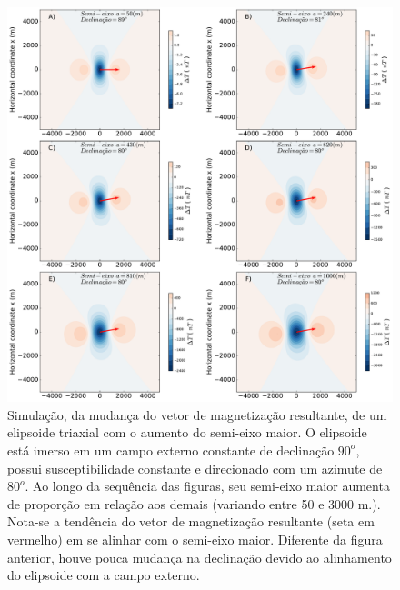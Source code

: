 \begin{figure}[hbt!]
	\centering \includegraphics[width=16 cm,height=16 cm]{figures/ellipsoid_shape_iso2}
	\caption[Simulação, da mudança do vetor de magnetização resultante, de um elipsoide triaxial com o aumento do semi-eixo maior.]{Simulação, da mudança do vetor de magnetização resultante, de um elipsoide triaxial com o aumento do semi-eixo maior. O elipsoide está imerso em um campo externo constante de declinação $90^o$, possui susceptibilidade constante e direcionado com um azimute de $80^o$. Ao longo da sequência das figuras, seu semi-eixo maior aumenta de proporção em relação aos demais (variando entre 50 e 3000 m.). Nota-se a tendência do vetor de magnetização resultante (seta em vermelho) em se alinhar com o semi-eixo maior. Diferente da figura anterior, houve pouca mudança na declinação devido ao alinhamento do elipsoide com a campo externo.}
	\label{fig:ellipsoid_shape_iso80}
\end{figure}